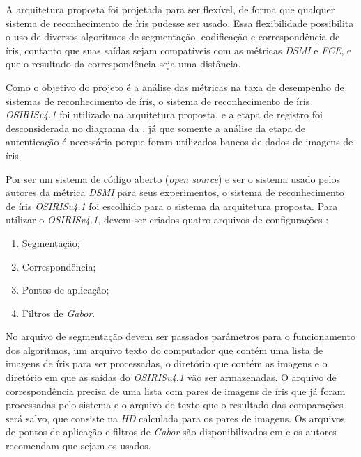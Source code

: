 \par A arquitetura proposta foi projetada para ser flexível, de forma que qualquer sistema de reconhecimento de íris pudesse ser usado. Essa flexibilidade possibilita o uso de diversos algoritmos de segmentação, codificação e correspondência de íris, contanto que suas saídas sejam compatíveis com as métricas \textit{\acrshort{DSMI}} e \textit{\acrshort{FCE}}, e que o resultado da correspondência seja uma distância.

\par Como o objetivo do projeto é a análise das métricas na taxa de desempenho de sistemas de reconhecimento de íris, o sistema de reconhecimento de íris \textit{OSIRISv4.1} \cite{othman2015, osirisv41, osirisv41_doc} foi utilizado na arquitetura proposta, e a etapa de registro foi desconsiderada no diagrama da , já que somente a análise da etapa de autenticação é necessária porque foram utilizados bancos de dados de imagens de íris.


\par Por ser um sistema de código aberto (\textit{open source}) e ser o sistema usado pelos autores da métrica \textit{\acrshort{DSMI}} \cite{Jenadeleh_2018_CVPR_Workshops} para seus experimentos, o sistema de reconhecimento de íris \textit{OSIRISv4.1} foi escolhido para o sistema da arquitetura proposta. Para utilizar o \textit{OSIRISv4.1}, devem ser criados quatro arquivos de configurações \cite{osirisv41_doc}:

\begin{enumerate}
    \item Segmentação;
    \item Correspondência;
    \item Pontos de aplicação;
    \item Filtros de \textit{Gabor}.
\end{enumerate}

\par No arquivo de segmentação devem ser passados parâmetros para o funcionamento dos algoritmos, um arquivo texto do computador que contém uma lista de imagens de íris para ser processadas, o diretório que contém as imagens e o diretório em que as saídas do \textit{OSIRISv4.1} vão ser armazenadas. O arquivo de correspondência precisa de uma lista com pares de imagens de íris que já foram processadas pelo sistema e o arquivo de texto que o resultado das comparações será salvo, que consiste na \textit{\acrshort{HD}} calculada para os pares de imagens. Os arquivos de pontos de aplicação e filtros de \textit{Gabor} são disponibilizados em \cite{osirisv41} e os autores recomendam que sejam os usados.

